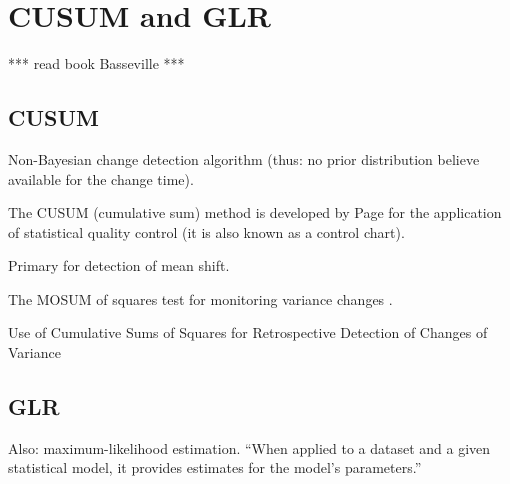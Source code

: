 \section{CUSUM and GLR}\label{cusum-glr}

*** read book Basseville \cite{basseville1993detection} ***


\subsection{CUSUM}
Non-Bayesian change detection algorithm (thus: no prior distribution believe available for the change time).

The CUSUM (cumulative sum) method is developed by Page \cite{page1954continuous} for the application of statistical quality control (it is also known as a control chart).

Primary for detection of mean shift.

The MOSUM of squares test for monitoring variance changes \cite{hsu2007mosum}.

Use of Cumulative Sums of Squares for Retrospective Detection of Changes of Variance \cite{inclan1994use}


\subsection{GLR}
Also: maximum-likelihood estimation. ``When applied to a dataset and a given statistical model, it provides estimates for the model's parameters.''